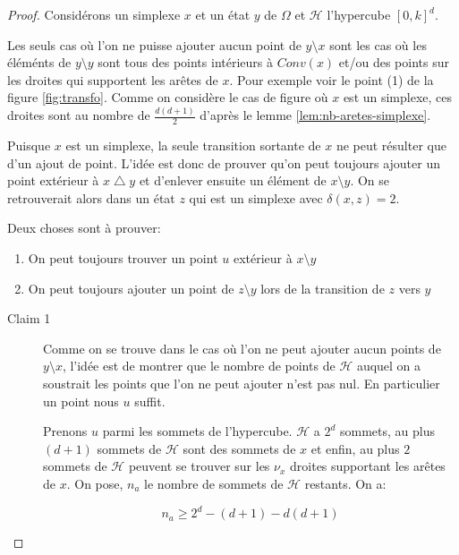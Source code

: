 \documentclass[11pt]{article}
\begin{document}
\begin{proof}
    Considérons un simplexe $x$ et un état $y$ de $\Omega$ et $\mathcal{H}$ l'hypercube $[0,k]^d$.

    Les seuls cas où l'on ne puisse ajouter aucun point de $y \setminus x$ sont les cas où les éléménts de $y \setminus y$ sont tous des points intérieurs à $Conv(x)$ et/ou des points sur les droites qui supportent les arêtes de $x$. Pour exemple voir le point (1) de la figure \ref{fig:transfo}. Comme on considère le cas de figure où $x$ est un simplexe, ces droites sont au nombre de $\frac{d(d+1)}{2}$ d'après le lemme \ref{lem:nb-aretes-simplexe}.

    Puisque $x$ est un simplexe, la seule transition sortante de $x$ ne peut résulter que d'un ajout de point. L'idée est donc de prouver qu'on peut toujours ajouter un point extérieur à $x \bigtriangleup y$ et d'enlever ensuite un élément de $x \setminus y$. On se retrouverait alors dans un état $z$ qui est un simplexe avec $\delta(x,z) = 2$.

    Deux choses sont à prouver:
    \begin{enumerate}
        \item On peut toujours trouver un point $u$ extérieur à $x \setminus y$
        \item On peut toujours ajouter un point de $z \setminus y$ lors de la transition de $z$ vers $y$
    \end{enumerate}

    \begin{description}
      \item[Claim 1]
      Comme on se trouve dans le cas où l'on ne peut ajouter aucun points de $y \setminus x$, l'idée est de montrer que le nombre de points de $\mathcal{H}$ auquel on a soustrait les points que l'on ne peut ajouter n'est pas nul. En particulier un point nous $u$ suffit.

      Prenons $u$ parmi les sommets de l'hypercube. $\mathcal{H}$ a $2^d$ sommets, au plus $(d+1)$ sommets de $\mathcal{H}$ sont des sommets de $x$ et enfin, au plus $2$ sommets de $\mathcal{H}$ peuvent se trouver sur les $\nu_x$ droites supportant les arêtes de $x$. On pose, $n_a$ le nombre de sommets de $\mathcal{H}$ restants. On a:

      \begin{equation}\label{eqn:sommets-restants}
        n_a \geq{2^d - (d+1) - d(d+1)}
      \end{equation}


\end{description}
\end{proof}
\end{document}
